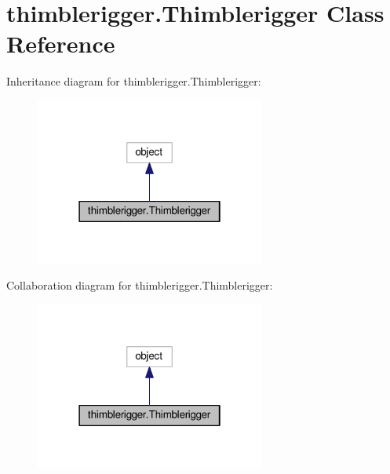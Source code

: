 \hypertarget{classthimblerigger_1_1Thimblerigger}{}\section{thimblerigger.\+Thimblerigger Class Reference}
\label{classthimblerigger_1_1Thimblerigger}


Inheritance diagram for thimblerigger.\+Thimblerigger\+:\nopagebreak
\begin{figure}[H]
\begin{center}
\leavevmode
\includegraphics[width=214pt]{classthimblerigger_1_1Thimblerigger__inherit__graph}
\end{center}
\end{figure}


Collaboration diagram for thimblerigger.\+Thimblerigger\+:\nopagebreak
\begin{figure}[H]
\begin{center}
\leavevmode
\includegraphics[width=214pt]{classthimblerigger_1_1Thimblerigger__coll__graph}
\end{center}
\end{figure}
